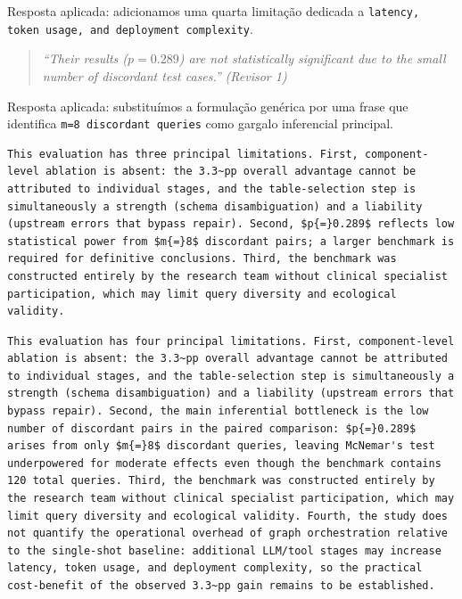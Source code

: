 \documentclass[11pt,a4paper]{article}
\begin{document}
\noindent Resposta aplicada: adicionamos uma quarta limitação dedicada a \texttt{latency, token usage, and deployment complexity}.

\begin{quote}
\textit{``Their results ($p{=}0.289$) are not statistically significant due to the small number of discordant test cases.''}
\hfill\textit{(Revisor 1)}
\end{quote}

\noindent Resposta aplicada: substituímos a formulação genérica por uma frase que identifica \texttt{m=8 discordant queries} como gargalo inferencial principal.

\begin{originalblock}
\begin{lstlisting}[style=texsnippet]
This evaluation has three principal limitations. First, component-level ablation is absent: the 3.3~pp overall advantage cannot be attributed to individual stages, and the table-selection step is simultaneously a strength (schema disambiguation) and a liability (upstream errors that bypass repair). Second, $p{=}0.289$ reflects low statistical power from $m{=}8$ discordant pairs; a larger benchmark is required for definitive conclusions. Third, the benchmark was constructed entirely by the research team without clinical specialist participation, which may limit query diversity and ecological validity.
\end{lstlisting}
\end{originalblock}

\begin{finalblock}
\begin{lstlisting}[style=texsnippet]
This evaluation has four principal limitations. First, component-level ablation is absent: the 3.3~pp overall advantage cannot be attributed to individual stages, and the table-selection step is simultaneously a strength (schema disambiguation) and a liability (upstream errors that bypass repair). Second, the main inferential bottleneck is the low number of discordant pairs in the paired comparison: $p{=}0.289$ arises from only $m{=}8$ discordant queries, leaving McNemar's test underpowered for moderate effects even though the benchmark contains 120 total queries. Third, the benchmark was constructed entirely by the research team without clinical specialist participation, which may limit query diversity and ecological validity. Fourth, the study does not quantify the operational overhead of graph orchestration relative to the single-shot baseline: additional LLM/tool stages may increase latency, token usage, and deployment complexity, so the practical cost-benefit of the observed 3.3~pp gain remains to be established.
\end{lstlisting}
\end{finalblock}
\end{document}

